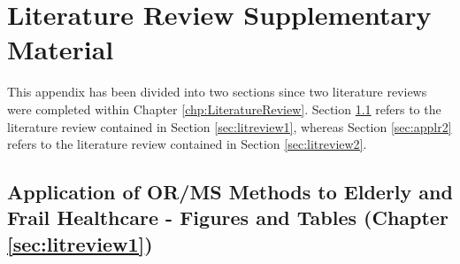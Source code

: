 \documentclass[thesis.tex]{subfiles}
\begin{document}
\chapter{Literature Review Supplementary Material}\label{App:LitReview}
This appendix has been divided into two sections since two literature reviews were completed within Chapter \ref{chp:LiteratureReview}. Section \ref{sec:applr1} refers to the literature review contained in Section \ref{sec:litreview1}, whereas Section \ref{sec:applr2} refers to the literature review contained in Section \ref{sec:litreview2}.


\section{Application of OR/MS Methods to Elderly
and Frail Healthcare - Figures and Tables (Chapter \ref{sec:litreview1})}\label{sec:applr1}
\end{document}
